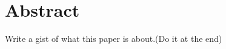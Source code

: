 \section{Abstract}
\label{sec:abstract}

Write a gist of what this paper is about.(Do it at the end)